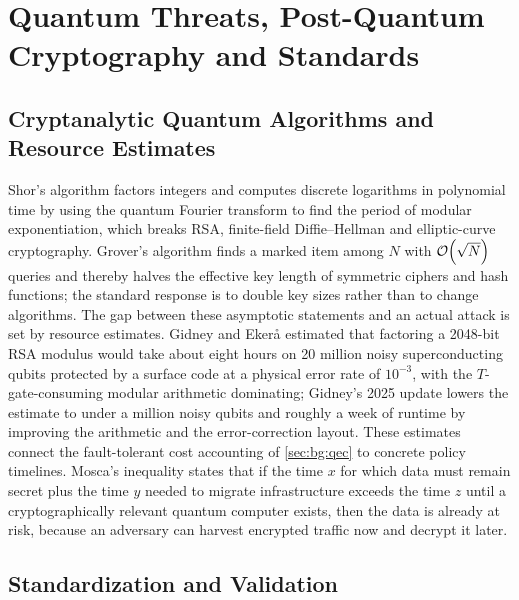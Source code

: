 \section{Quantum Threats, Post-Quantum Cryptography and Standards}\label{sec:bg:crypto}

\subsection{Cryptanalytic Quantum Algorithms and Resource Estimates}

Shor's algorithm \cite{shor1997factoring} factors integers and computes discrete logarithms in polynomial time by using the quantum Fourier transform to find the period of modular exponentiation, which breaks RSA, finite-field Diffie--Hellman and elliptic-curve cryptography. Grover's algorithm \cite{grover1996search} finds a marked item among $N$ with $\mathcal{O}\!\left(\sqrt{N}\right)$ queries and thereby halves the effective key length of symmetric ciphers and hash functions; the standard response is to double key sizes rather than to change algorithms. The gap between these asymptotic statements and an actual attack is set by resource estimates. Gidney and Eker{\aa} \cite{gidney2021rsa} estimated that factoring a 2048-bit RSA modulus would take about eight hours on 20 million noisy superconducting qubits protected by a surface code at a physical error rate of $10^{-3}$, with the $T$-gate-consuming modular arithmetic dominating; Gidney's 2025 update \cite{gidney2025million} lowers the estimate to under a million noisy qubits and roughly a week of runtime by improving the arithmetic and the error-correction layout. These estimates connect the fault-tolerant cost accounting of \cref{sec:bg:qec} to concrete policy timelines. Mosca's inequality \cite{mosca2018cybersecurity} states that if the time $x$ for which data must remain secret plus the time $y$ needed to migrate infrastructure exceeds the time $z$ until a cryptographically relevant quantum computer exists, then the data is already at risk, because an adversary can harvest encrypted traffic now and decrypt it later.

\subsection{Standardization and Validation}

